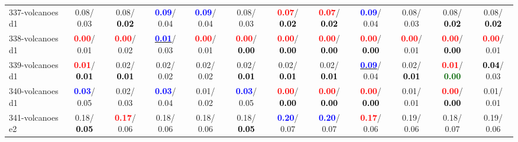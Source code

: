 \begin{table}[h]
\begin{center}
{\begin{tabular}{lc|c|c|c|c|c|c|c|c|c|c}
337-volcanoes d1 &   0.08/  0.03 &   0.08/\textcolor{black}{\textbf{  0.02}} & \textcolor{blue}{\textbf{  0.09}}/  0.04 & \textcolor{blue}{\textbf{  0.09}}/  0.04 &   0.08/  0.03 & \textcolor{red}{\textbf{  0.07}}/\textcolor{black}{\textbf{  0.02}} & \textcolor{red}{\textbf{  0.07}}/\textcolor{black}{\textbf{  0.02}} & \textcolor{blue}{\textbf{  0.09}}/  0.04 &   0.08/  0.03 &   0.08/\textcolor{black}{\textbf{  0.02}} &   0.08/\textcolor{black}{\textbf{  0.02}} \\
338-volcanoes d1 & \textcolor{red}{\textbf{  0.00}}/  0.01 & \textcolor{red}{\textbf{  0.00}}/  0.02 & \underline{\textcolor{blue}{\textbf{  0.01}}}/  0.03 & \textcolor{red}{\textbf{  0.00}}/  0.01 & \textcolor{red}{\textbf{  0.00}}/\textcolor{black}{\textbf{  0.00}} & \textcolor{red}{\textbf{  0.00}}/\textcolor{black}{\textbf{  0.00}} & \textcolor{red}{\textbf{  0.00}}/\textcolor{black}{\textbf{  0.00}} & \textcolor{red}{\textbf{  0.00}}/\textcolor{black}{\textbf{  0.00}} & \textcolor{red}{\textbf{  0.00}}/  0.01 & \textcolor{red}{\textbf{  0.00}}/\textcolor{black}{\textbf{  0.00}} & \textcolor{red}{\textbf{  0.00}}/  0.01 \\
339-volcanoes d1 & \textcolor{red}{\textbf{  0.01}}/\textcolor{black}{\textbf{  0.01}} &   0.02/\textcolor{black}{\textbf{  0.01}} &   0.02/  0.02 &   0.02/  0.02 &   0.02/\textcolor{black}{\textbf{  0.01}} &   0.02/\textcolor{black}{\textbf{  0.01}} &   0.02/\textcolor{black}{\textbf{  0.01}} & \underline{\textcolor{blue}{\textbf{  0.09}}}/  0.04 &   0.02/\textcolor{black}{\textbf{  0.01}} & \textcolor{red}{\textbf{  0.01}}/\textcolor{darkgreen}{\textbf{  0.00}} & \textcolor{black}{\textbf{  0.04}}/  0.03 \\
340-volcanoes d1 & \textcolor{blue}{\textbf{  0.03}}/  0.05 &   0.02/  0.03 & \textcolor{blue}{\textbf{  0.03}}/  0.04 &   0.01/  0.02 & \textcolor{blue}{\textbf{  0.03}}/  0.05 & \textcolor{red}{\textbf{  0.00}}/\textcolor{black}{\textbf{  0.00}} & \textcolor{red}{\textbf{  0.00}}/\textcolor{black}{\textbf{  0.00}} & \textcolor{red}{\textbf{  0.00}}/\textcolor{black}{\textbf{  0.00}} &   0.01/  0.01 & \textcolor{red}{\textbf{  0.00}}/\textcolor{black}{\textbf{  0.00}} &   0.01/  0.01 \\
341-volcanoes e2 &   0.18/\textcolor{black}{\textbf{  0.05}} & \textcolor{red}{\textbf{  0.17}}/  0.06 &   0.18/  0.06 &   0.18/  0.06 &   0.18/\textcolor{black}{\textbf{  0.05}} & \textcolor{blue}{\textbf{  0.20}}/  0.07 & \textcolor{blue}{\textbf{  0.20}}/  0.07 & \textcolor{red}{\textbf{  0.17}}/  0.06 &   0.19/  0.06 &   0.18/  0.07 &   0.19/  0.06 \\ \hline

\end{tabular}}
\end{center}
\end{table}
